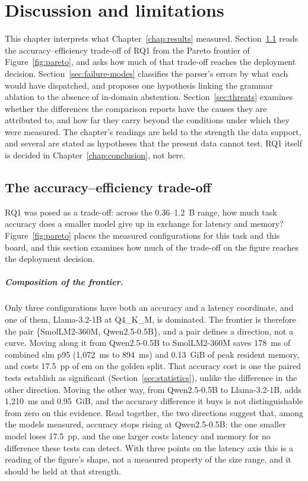 \chapter{Discussion and limitations}
\label{chap:discussion}

This chapter interprets what Chapter~\ref{chap:results} measured. Section~\ref{sec:tradeoff}
reads the accuracy--efficiency trade-off of RQ1 from the Pareto frontier of
Figure~\ref{fig:pareto}, and asks how much of that trade-off reaches the deployment decision.
Section~\ref{sec:failure-modes} classifies the parser's errors by what each would have dispatched,
and proposes one hypothesis linking the grammar ablation to the absence of in-domain abstention.
Section~\ref{sec:threats} examines whether the differences the comparison reports have the causes
they are attributed to, and how far they carry beyond the conditions under which they were
measured. The chapter's readings are held to the strength the data support, and several are stated as
hypotheses that the present data cannot test. RQ1 itself is decided in
Chapter~\ref{chap:conclusion}, not here.

\section{The accuracy--efficiency trade-off}
\label{sec:tradeoff}

RQ1 was posed as a trade-off: across the 0.36--1.2~B range, how much task accuracy does a smaller
model give up in exchange for latency and memory? Figure~\ref{fig:pareto} places the measured
configurations for this task and this board, and this section examines how much of the trade-off
on the figure reaches the deployment decision.

\paragraph{Composition of the frontier.} Only three configurations have both an accuracy and a
latency coordinate, and one of them, Llama-3.2-1B at Q4\_K\_M, is dominated. The frontier is
therefore the pair \{SmolLM2-360M, Qwen2.5-0.5B\}, and a pair defines a direction, not a curve.
Moving along it from Qwen2.5-0.5B to SmolLM2-360M saves 178~ms of combined \gls{slm} p95
(1{,}072~ms to 894~ms) and 0.13~GiB of peak resident memory, and costs 17.5~pp of \gls{em} on the
golden split. That accuracy cost is one the paired tests establish as significant
(Section~\ref{sec:statistics}), unlike the difference in the other direction. Moving the other way, from Qwen2.5-0.5B to
Llama-3.2-1B, adds 1{,}210~ms and 0.95~GiB, and the accuracy difference it buys is not
distinguishable from zero on this evidence. Read together, the two directions suggest that,
among the models measured, accuracy stops rising at Qwen2.5-0.5B: the one smaller model loses
17.5~pp, and the one larger costs latency and memory for no difference these tests can detect.
With three points on the latency axis this is a reading of the figure's shape, not a measured
property of the size range, and it should be held at that strength.

